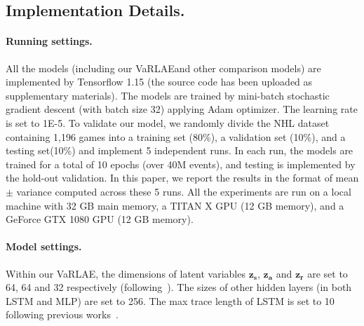 \documentclass{article}
\newcommand{\latentvariables}{\mathbf{z}}
\newcommand{\state}{\mathbf{s}}
\newcommand{\action}{\mathbf{a}}
\newcommand{\reward}{\boldsymbol{r}}
\newcommand{\player}{pl}
\newcommand{\system}{VaRLAE\;}
\begin{document}
\subsection{Implementation Details.}
\paragraph{Running settings.} All the models (including our \system and other comparison models) are implemented by Tensorflow 1.15 (the source code has been uploaded as supplementary materials). The models are trained by mini-batch stochastic gradient descent (with batch size 32) applying Adam optimizer. The learning rate is set to 1E-5. To validate our model, we randomly divide the NHL dataset containing 1,196 games into a training set (80\%), a validation set (10\%), and a testing set(10\%) and implement 5 independent runs. In each run, the models are trained for a total of 10 epochs (over 40M events), and testing is implemented by the hold-out validation. In this paper, we report the results in the format of mean $\pm$ variance computed across these 5 runs. All the experiments are run on a local machine with 32 GB main memory, a TITAN X GPU (12 GB memory), and a GeForce GTX 1080 GPU (12 GB memory). 

\paragraph{Model settings.} 
Within our \system, the dimensions of latent variables $\latentvariables_{\state}$, $\latentvariables_{\action}$ and $\latentvariables_{\reward}$ are set to 64, 64 and 32 respectively (following~\cite{SonderbyLadderVAE16}). The sizes of other hidden layers (in both LSTM and MLP) are set to 256. The max trace length of LSTM is set to 10 following previous works~\cite{Liu2018,littlestone}. 


\end{document}
